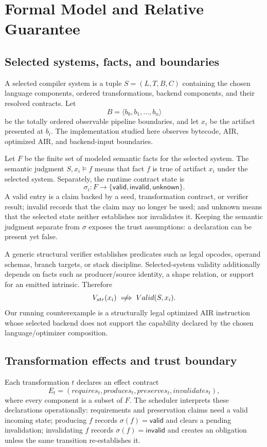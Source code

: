 \section{Formal Model and Relative Guarantee}
\subsection{Selected systems, facts, and boundaries}
A selected compiler system is a tuple $S=(L,T,B,C)$ containing the chosen language components, ordered transformations, backend components, and their resolved contracts. Let
\[
  B = \langle b_0,b_1,\ldots,b_n\rangle
\]
be the totally ordered observable pipeline boundaries, and let $x_i$ be the artifact presented at $b_i$. The implementation studied here observes bytecode, AIR, optimized AIR, and backend-input boundaries.

Let $F$ be the finite set of modeled semantic facts for the selected system. The semantic judgment $S,x_i\models f$ means that fact $f$ is true of artifact $x_i$ under the selected system. Separately, the runtime contract state is
\[
  \sigma_i : F \rightarrow \{\mathsf{valid},\mathsf{invalid},\mathsf{unknown}\}.
\]
A \textsf{valid} entry is a claim backed by a seed, transformation contract, or verifier result; \textsf{invalid} records that the claim may no longer be used; and \textsf{unknown} means that the selected state neither establishes nor invalidates it. Keeping the semantic judgment separate from $\sigma$ exposes the trust assumptions: a declaration can be present yet false.

A generic structural verifier establishes predicates such as legal opcodes, operand schemas, branch targets, or stack discipline. Selected-system validity additionally depends on facts such as producer/source identity, a shape relation, or support for an emitted intrinsic. Therefore
\[
  V_{str}(x_i) \centernot\implies Valid(S,x_i).
\]
Our running counterexample is a structurally legal optimized AIR instruction whose selected backend does not support the capability declared by the chosen language/optimizer composition.

\subsection{Transformation effects and trust boundary}
Each transformation $t$ declares an effect contract
\[
 E_t=(requires_t, produces_t, preserves_t, invalidates_t),
\]
where every component is a subset of $F$. The scheduler interprets these declarations operationally: requirements and preservation claims need a valid incoming state; producing $f$ records $\sigma(f)=\mathsf{valid}$ and clears a pending invalidation; invalidating $f$ records $\sigma(f)=\mathsf{invalid}$ and creates an obligation unless the same transition re-establishes it.

